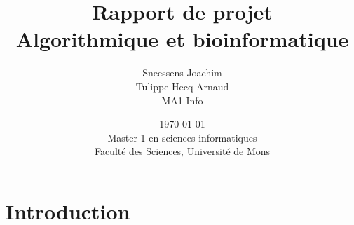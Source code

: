 \documentclass{article}
\title{
{\Huge Rapport de projet}\\
Algorithmique et bioinformatique}
\author{Sneessens Joachim\\Tulippe-Hecq Arnaud\\MA1 Info}
\date{\today\\
Master 1 en sciences informatiques\\
\vspace{1cm}
Faculté des Sciences, Université de Mons}
\begin{document}
\maketitle

\newpage

\section{Introduction}
\end{document}
